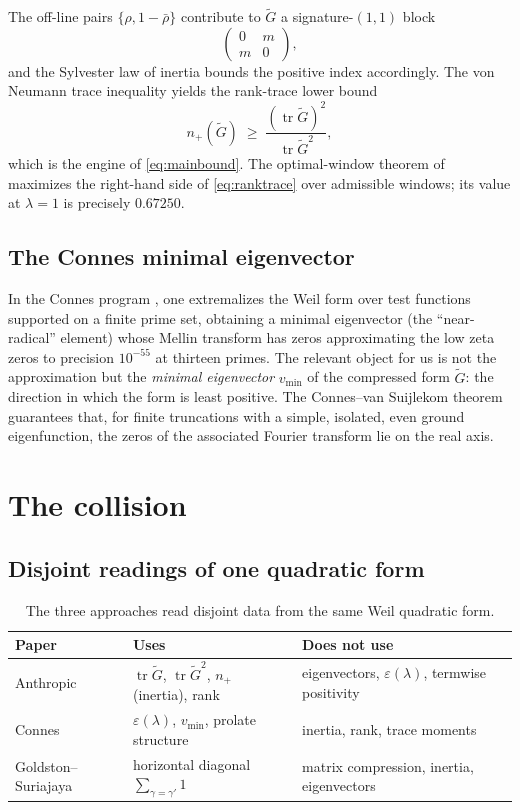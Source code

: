 \documentclass[11pt]{article}
\newcommand{\tr}{\operatorname{tr}}
\begin{document}
The off-line pairs $\{\rho,1-\bar\rho\}$ contribute to $\tilde G$ a signature-$(1,1)$ block
\[
\begin{pmatrix} 0 & m \\ m & 0 \end{pmatrix},
\]
and the Sylvester law of inertia bounds the positive index accordingly. The von Neumann trace inequality yields the rank-trace lower bound
\begin{equation}
n_+(\tilde G)\;\ge\;\frac{(\tr\tilde G)^2}{\tr\tilde G^2},
\label{eq:ranktrace}
\end{equation}
which is the engine of \eqref{eq:mainbound}. The optimal-window theorem of \cite{anthropic} maximizes the right-hand side of \eqref{eq:ranktrace} over admissible windows; its value at $\lambda=1$ is precisely $0.67250$.

\subsection{The Connes minimal eigenvector}

In the Connes program \cite{connes}, one extremalizes the Weil form over test functions supported on a finite prime set, obtaining a minimal eigenvector (the ``near-radical'' element) whose Mellin transform has zeros approximating the low zeta zeros to precision $10^{-55}$ at thirteen primes. The relevant object for us is not the approximation but the \emph{minimal eigenvector} $v_{\min}$ of the compressed form $\tilde G$: the direction in which the form is least positive. The Connes--van Suijlekom theorem guarantees that, for finite truncations with a simple, isolated, even ground eigenfunction, the zeros of the associated Fourier transform lie on the real axis.

\section{The collision}

\subsection{Disjoint readings of one quadratic form}

\begin{table}[h]
\centering
\begin{tabular}{lll}
\toprule
Paper & Uses & Does not use \\
\midrule
Anthropic \cite{anthropic} & $\tr\tilde G$, $\tr\tilde G^2$, $n_+$ (inertia), rank & eigenvectors, $\varepsilon(\lambda)$, termwise positivity \\
Connes \cite{connes} & $\varepsilon(\lambda)$, $v_{\min}$, prolate structure & inertia, rank, trace moments \\
Goldston--Suriajaya \cite{pcc} & horizontal diagonal $\sum_{\gamma=\gamma'}1$ & matrix compression, inertia, eigenvectors \\
\bottomrule
\end{tabular}
\caption{The three approaches read disjoint data from the same Weil quadratic form.}
\label{tab:disjoint}
\end{table}
\end{document}
